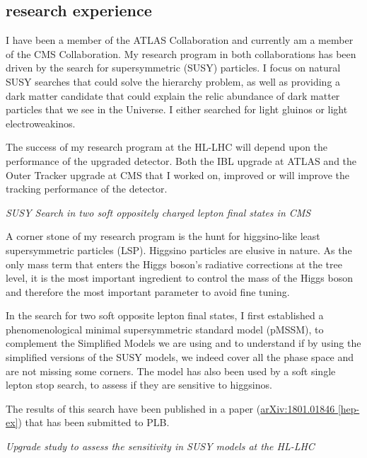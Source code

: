 \documentclass[]{cv} %
\begin{document}
\begin{researchexperience}
\section{research experience}

I have been a member of the ATLAS Collaboration and currently am a member of the
CMS Collaboration. My research program in both collaborations has been driven by
the search for supersymmetric (SUSY) particles. I focus on natural SUSY searches
that could solve the hierarchy problem, as well as providing a dark matter
candidate that could explain the relic abundance of dark matter particles that
we see in the Universe. I either searched for light gluinos or light
electroweakinos.

The success of my research program at the HL-LHC will depend upon the
performance of the upgraded detector. Both the IBL upgrade at ATLAS and
the Outer Tracker upgrade at CMS that I worked on, improved or will improve the
tracking performance of the detector.

\vspace{15pt}
\Large{}
\textit{SUSY Search in two soft oppositely charged lepton final states in CMS}
\normalsize{}

A corner stone of my research program is the hunt for higgsino-like least
supersymmetric particles (LSP). Higgsino particles are elusive in nature.  As
the only mass term that enters the Higgs boson's radiative corrections at the
tree level, it is the most important ingredient to control the mass of the Higgs
boson and therefore the most important parameter to avoid fine tuning.

In the search for two soft opposite lepton final states, I first established a
phenomenological minimal supersymmetric standard model (pMSSM), to complement
the Simplified Models we are using and to understand if by using the simplified
versions of the SUSY models, we indeed cover all the phase space and are not
missing some corners. The model has also been used by a soft single lepton stop
search, to assess if they are sensitive to higgsinos.

The results of this search have been published in a paper
(\href{https://arxiv.org/abs/1801.01846}{arXiv:1801.01846 [hep-ex]}) that has
been submitted to PLB.

\vspace{15pt}
\Large{}
\textit{Upgrade study to assess the sensitivity in SUSY models at the HL-LHC} \\
\normalsize{}


\end{researchexperience}
\end{document}
